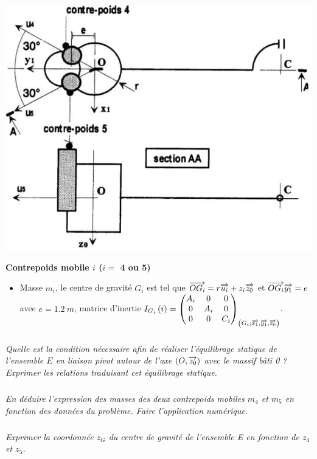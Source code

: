 \documentclass[10pt,fleqn]{article} %
\begin{document}
\begin{multicols}{2}
\begin{center}
\includegraphics[width=\linewidth]{images/fig_04.png}
\end{center}


\textbf{Contrepoids mobile $i$ ($i=$ 4 ou 5)}
\begin{itemize}
\item Masse $m_i$, le centre de gravité $G_i$ est tel que $\vect{OG_i}=r\vect{u_i}+z_i \vect{z_0}$ et $\vect{OG_i}\vect{y_1}=e$  avec ${e}=\SI{1,2}{m}$, matrice d'inertie $\inertie{G_i}{i}=\matinertie{A_i}{A_i}{C_i}{0}{0}{0}{\repere{G_i}{x_1}{y_1}{z_0}}$.
\end{itemize}



\subparagraph{}
\textit{Quelle est la condition nécessaire afin de réaliser l’équilibrage statique de l’ensemble
$E$ en liaison pivot autour de l’axe $\axe{O}{z_0}$ avec le massif bâti 0 ? Exprimer les relations
traduisant cet équilibrage statique.
}
\ifprof
\begin{corrige}
\end{corrige}\else\fi


\subparagraph{}
\textit{En déduire l’expression des masses des deux contrepoids mobiles $m_4$ et $m_5$ en fonction des données du
problème. Faire l’application numérique. }
\ifprof
\begin{corrige}
\end{corrige}\else\fi


\subparagraph{}
\textit{Exprimer la coordonnée $z_G$ du centre de gravité de l’ensemble E en fonction de $z_4$ et $z_5$.}
\ifprof
\begin{corrige}
\end{corrige}\else\fi



\end{multicols}
\end{document}
